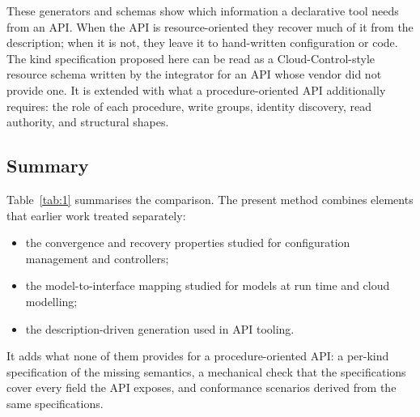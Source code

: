These generators and schemas show which information a declarative tool needs from an API. When the
API is resource-oriented they recover much of it from the description; when it is not, they leave it
to hand-written configuration or code. The kind specification proposed here can be read as a
Cloud-Control-style resource schema written by the integrator for an API whose vendor did not
provide one. It is extended with what a procedure-oriented API additionally requires: the role of
each procedure, write groups, identity discovery, read authority, and structural shapes.

\subsection{Summary}\label{sec:2.5}

Table~\ref{tab:1} summarises the comparison. The present method combines elements that earlier work treated
separately:

\begin{itemize}
\item
  the convergence and recovery properties studied for configuration management and controllers;
\item
  the model-to-interface mapping studied for models at run time and cloud modelling;
\item
  the description-driven generation used in API tooling.
\end{itemize}

It adds what none of them provides for a procedure-oriented API: a per-kind specification of the
missing semantics, a mechanical check that the specifications cover every field the API exposes, and
conformance scenarios derived from the same specifications.

